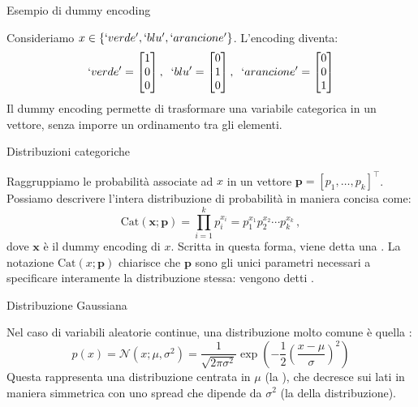 \documentclass[12pt,aspectratio=169]{beamer}
\begin{document}
\begin{frame}{Esempio di dummy encoding}
	
	Consideriamo $x \in \left\{`verde', `blu', `arancione'\right\}$. L'encoding diventa:
	\begin{equation}
		`verde' = \begin{bmatrix} 1 \\ 0 \\ 0 \end{bmatrix} ,\;\; `blu' = \begin{bmatrix} 0 \\ 1 \\ 0 \end{bmatrix} ,\;\; `arancione' = \begin{bmatrix} 0 \\ 0 \\ 1 \end{bmatrix}
	\end{equation}
	Il dummy encoding permette di trasformare una variabile categorica in un vettore, senza imporre un ordinamento tra gli elementi.
	
\end{frame}

\begin{frame}{Distribuzioni categoriche}
	
	Raggruppiamo le probabilità associate ad $x$ in un vettore $\mathbf{p} = \left[p_1, \ldots, p_k\right]^\top$. Possiamo descrivere l'intera distribuzione di probabilità in maniera concisa come:
	\begin{equation}
		\text{Cat}(\mathbf{x} ; \mathbf{p}) = \prod_{i=1}^k p_i^{x_i} = p_1^{x_1}p_2^{x_2} \cdots p_k^{x_k} \,,
	\end{equation}
	dove $\mathbf{x}$ è il dummy encoding di $x$. Scritta in questa forma, viene detta una . La notazione $\text{Cat}(x ; \mathbf{p})$ chiarisce che $\mathbf{p}$ sono gli unici parametri necessari a specificare interamente la distribuzione stessa: vengono detti .
	
\end{frame}

\begin{frame}{Distribuzione Gaussiana}
	
	Nel caso di variabili aleatorie continue, una distribuzione molto comune è quella :
	\begin{equation}
		p(x) = \mathcal{N}(x;\mu,\sigma^2)= \frac{1}{\sqrt{2\pi \sigma^2}}\exp\left(-\frac{1}{2}\left(\frac{x-\mu}{\sigma}\right)^2\right)
	\end{equation}
	Questa rappresenta una distribuzione centrata in $\mu$ (la ), che decresce sui lati in maniera simmetrica con uno spread che dipende da $\sigma^2$ (la  della distribuzione).
	
\end{frame}
\end{document}
